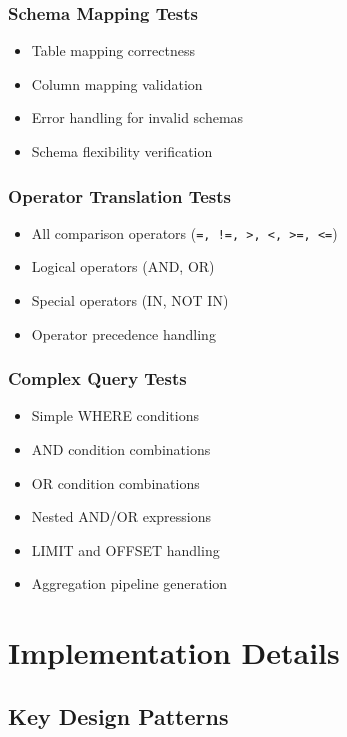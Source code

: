 \documentclass[12pt,a4paper]{article}
\begin{document}
\subsubsection{Schema Mapping Tests}
\begin{itemize}
    \item Table mapping correctness
    \item Column mapping validation
    \item Error handling for invalid schemas
    \item Schema flexibility verification
\end{itemize}

\subsubsection{Operator Translation Tests}
\begin{itemize}
    \item All comparison operators (\texttt{=, !=, >, <, >=, <=})
    \item Logical operators (AND, OR)
    \item Special operators (IN, NOT IN)
    \item Operator precedence handling
\end{itemize}

\subsubsection{Complex Query Tests}
\begin{itemize}
    \item Simple WHERE conditions
    \item AND condition combinations
    \item OR condition combinations
    \item Nested AND/OR expressions
    \item LIMIT and OFFSET handling
    \item Aggregation pipeline generation
\end{itemize}

\newpage

\section{Implementation Details}

\subsection{Key Design Patterns}
\end{document}
